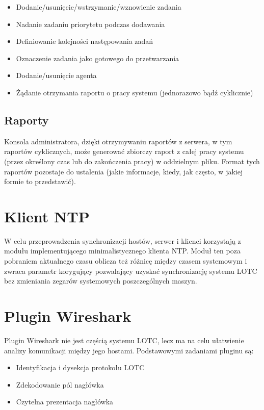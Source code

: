 \documentclass[10pt,a4paper]{article}
\begin{document}
			\begin{itemize}   
				\item Dodanie/usunięcie/wstrzymanie/wznowienie zadania
				\item Nadanie zadaniu priorytetu podczas dodawania
				\item Definiowanie kolejności następowania zadań
				\item Oznaczenie zadania jako gotowego do przetwarzania
				\item Dodanie/usunięcie agenta
				\item Żądanie otrzymania raportu o pracy systemu (jednorazowo bądź cyklicznie)
			\end{itemize}
		
		\subsection{Raporty}
			Konsola administratora, dzięki otrzymywaniu raportów z serwera, w tym raportów cyklicznych, może generować zbiorczy raport z całej pracy systemu (przez określony czas lub do zakończenia pracy) w oddzielnym pliku. Format tych raportów pozostaje do ustalenia (jakie informacje, kiedy, jak często, w jakiej formie to przedstawić).
    
    \section{Klient NTP}
    
        W celu przeprowadzenia synchronizacji hostów, serwer i klienci korzystają z modułu implementującego minimalistycznego klienta NTP. Moduł ten poza pobraniem aktualnego czasu oblicza też różnicę między czasem systemowym i zwraca parametr korygujący pozwalający uzyskać synchronizację systemu LOTC bez zmieniania zegarów systemowych poszczególnych maszyn. 
    
    \section{Plugin Wireshark}
    
        Plugin Wireshark nie jest częścią systemu LOTC, lecz ma na celu ułatwienie analizy komunikacji między jego hostami. Podstawowymi zadaniami pluginu są:
        
        \begin{itemize}   
			\item Identyfikacja i dysekcja protokołu LOTC
			\item Zdekodowanie pól nagłówka
		    \item Czytelna prezentacja nagłówka
	    \end{itemize}
	    
\end{document}
